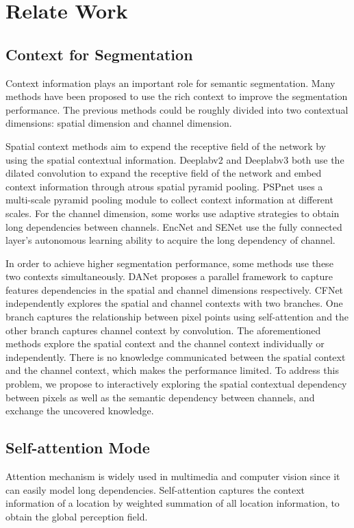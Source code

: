 \documentclass[10pt,journal,cspaper,compsoc]{IEEEtran}
\begin{document}
\section{Relate Work}
	
\subsection{Context for Segmentation}
Context information plays an important role for semantic segmentation. Many methods have been proposed to use the rich context to improve the segmentation performance. The previous methods could be roughly divided into two contextual dimensions: spatial dimension and channel dimension.
	
Spatial context methods \cite{chen2017rethinking, lin2017exploring, liu2015parsenet, zhang2020causal} aim to expend the receptive field of the network by using the spatial contextual information. Deeplabv2 \cite{chen2014semantic} and Deeplabv3 \cite{chen2017rethinking} both use the dilated convolution to expand the receptive field of the network and embed context information through atrous spatial pyramid pooling. PSPnet \cite{zhao2017pyramid} uses a multi-scale pyramid pooling module to collect context information at different scales. For the channel dimension, some works use adaptive strategies to obtain long dependencies between channels. EncNet \cite{zhang2018context} and SENet \cite{hu2018squeeze} use the fully connected layer's autonomous learning ability to acquire the long dependency of channel.
	
In order to achieve higher segmentation performance, some methods use these two contexts simultaneously. DANet \cite{fu2019dual} proposes a parallel framework to capture features dependencies in the spatial and channel dimensions respectively. CFNet \cite{zhang2019co} independently explores the spatial and channel contexts with two branches. One branch captures the relationship between pixel points using self-attention and the other branch captures channel context by convolution. The aforementioned methods explore the spatial context and the channel context individually or independently. There is no knowledge communicated between the spatial context and the channel context, which makes the performance limited. To address this problem, we propose to interactively exploring the spatial contextual dependency between pixels as well as the semantic dependency between channels, and exchange the uncovered knowledge.
	
\subsection{Self-attention Mode}
Attention mechanism \cite{huang2019interlaced, wang2018non, vaswani2017attention} is widely used in multimedia and computer vision since it can easily model long dependencies. Self-attention captures the context information of a location by weighted summation of all location information, to obtain the global perception field.
	
\end{document}
